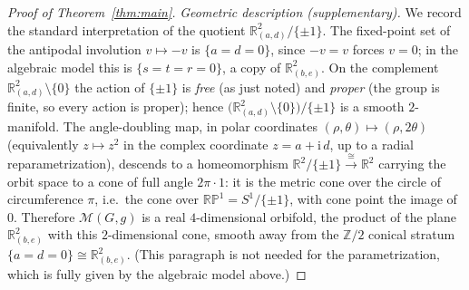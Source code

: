\documentclass{amsart}
\theoremstyle{definition}
\theoremstyle{remark}
\begin{document}
\begin{proof}[Proof of Theorem~\ref{thm:main}]
\emph{Geometric description (supplementary).} We record the standard interpretation of the quotient
$\mathbb R^2_{(a,d)}/\{\pm1\}$. The fixed-point set of the antipodal involution $v\mapsto -v$ is
$\{a=d=0\}$, since $-v=v$ forces $v=0$; in the algebraic model this is $\{s=t=r=0\}$, a copy of
$\mathbb R^2_{(b,e)}$. On the complement $\mathbb R^2_{(a,d)}\setminus\{0\}$ the action of $\{\pm1\}$ is
\emph{free} (as just noted) and \emph{proper} (the group is finite, so every action is proper); hence
$\bigl(\mathbb R^2_{(a,d)}\setminus\{0\}\bigr)/\{\pm1\}$ is a smooth $2$-manifold. The angle-doubling map,
in polar coordinates $(\rho,\theta)\mapsto(\rho,2\theta)$ (equivalently $z\mapsto z^2$ in the complex
coordinate $z=a+\mathrm i\,d$, up to a radial reparametrization), descends to a homeomorphism
$\mathbb R^2/\{\pm1\}\xrightarrow{\;\cong\;}\mathbb R^2$ carrying the orbit space to a cone of full angle
$2\pi\cdot 1$: it is the metric cone over the circle of circumference $\pi$, i.e.\ the cone over
$\mathbb{RP}^1=S^1/\{\pm1\}$, with cone point the image of $0$. Therefore $\mathcal M(G,g)$ is a real
$4$-dimensional orbifold, the product of the plane $\mathbb R^2_{(b,e)}$ with this $2$-dimensional cone,
smooth away from the $\mathbb Z/2$ conical stratum $\{a=d=0\}\cong\mathbb R^2_{(b,e)}$. (This paragraph is
not needed for the parametrization, which is fully given by the algebraic model above.)
\end{proof}
\end{document}
